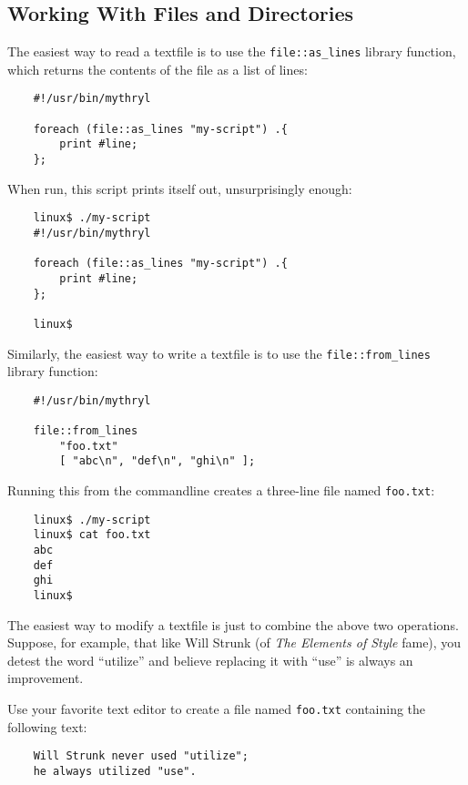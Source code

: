 \cutend*


\subsection{Working With Files and Directories}

The easiest way to read a textfile is to use the {\tt file::as_lines} 
library function, which returns the contents of the file as a list 
of lines:

\begin{verbatim}
    #!/usr/bin/mythryl

    foreach (file::as_lines "my-script") .{
        print #line;
    };
\end{verbatim}

When run, this script prints itself out, unsurprisingly enough:

\begin{verbatim}
    linux$ ./my-script
    #!/usr/bin/mythryl

    foreach (file::as_lines "my-script") .{
        print #line;
    };

    linux$
\end{verbatim}

Similarly, the easiest way to write a textfile is to use the 
{\tt file::from\_lines} library function:

\begin{verbatim}
    #!/usr/bin/mythryl

    file::from_lines
        "foo.txt"
        [ "abc\n", "def\n", "ghi\n" ];
\end{verbatim}

Running this from the commandline creates a three-line 
file named {\tt foo.txt}:

\begin{verbatim}
    linux$ ./my-script
    linux$ cat foo.txt
    abc
    def
    ghi
    linux$
\end{verbatim}

The easiest way to modify a textfile is just to combine 
the above two operations.  Suppose, for example, that like 
Will Strunk (of {\it The Elements of Style} fame), you 
detest the word ``utilize'' and believe replacing it with 
``use'' is always an improvement.

Use your favorite text editor to create a file named {\tt foo.txt} 
containing the following text:

\begin{verbatim}
    Will Strunk never used "utilize";
    he always utilized "use".
\end{verbatim}

